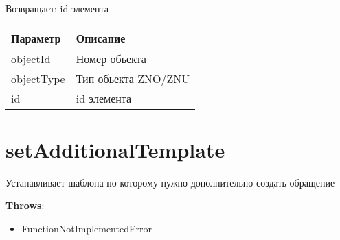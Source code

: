 Возвращает: id элемента

\begin{longtable}[]{@{}ll@{}}
\toprule
Параметр & Описание\tabularnewline
\midrule
\endhead
objectId & Номер обьекта\tabularnewline
objectType & Тип обьекта 
ZNO/ZNU\tabularnewline
id & id элемента\tabularnewline
\bottomrule
\end{longtable}

\hypertarget{setadditionaltemplateextsystem-templateid-id}{%
\section{setAdditionalTemplate}\label{setadditionaltemplateextsystem-templateid-id}}

Устанавливает шаблона по которому нужно дополнительно создать обращение

\textbf{Throws}:

\begin{itemize}
\tightlist
\item
  FunctionNotImplementedError
\end{itemize}

